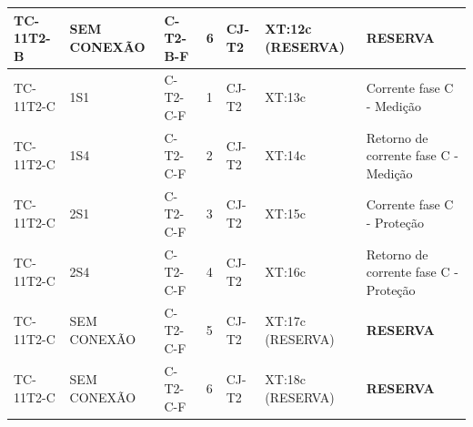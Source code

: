 \documentclass[11pt,a4paper]{article}
\newcommand{\res}{\textbf{RESERVA}}
\begin{document}
\begin{landscape}
\begin{longtable}{@{}L{2.5cm}L{2.4cm}L{2.8cm}L{0.85cm}L{2.4cm}L{2.6cm}L{9.5cm}@{}}
TC-11T2-B & SEM CONEXÃO & C-T2-B-F & 6 & CJ-T2 & XT:12c (RESERVA) & \res{}\\
\midrule
TC-11T2-C & 1S1 & C-T2-C-F & 1 & CJ-T2 & XT:13c & Corrente fase C - Medição\\
TC-11T2-C & 1S4 & C-T2-C-F & 2 & CJ-T2 & XT:14c & Retorno de corrente fase C - Medição\\
TC-11T2-C & 2S1 & C-T2-C-F & 3 & CJ-T2 & XT:15c & Corrente fase C - Proteção\\
TC-11T2-C & 2S4 & C-T2-C-F & 4 & CJ-T2 & XT:16c & Retorno de corrente fase C - Proteção\\
TC-11T2-C & SEM CONEXÃO & C-T2-C-F & 5 & CJ-T2 & XT:17c (RESERVA) & \res{}\\
TC-11T2-C & SEM CONEXÃO & C-T2-C-F & 6 & CJ-T2 & XT:18c (RESERVA) & \res{}\\
\end{longtable}\endgroup\end{landscape}
\end{document}
